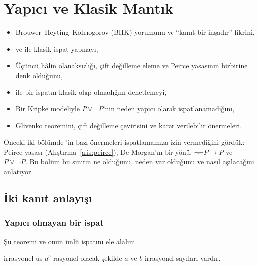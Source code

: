 \chapter{Yapıcı ve Klasik Mantık}\label{bol:yapici-klasik}

\begin{bolumhedefleri}
\begin{itemize}
  \item Brouwer--Heyting--Kolmogorov (BHK) yorumunu ve ``kanıt bir
        inşadır'' fikrini,
  \item {} ve  ile klasik
        ispat yapmayı,
  \item Üçüncü hâlin olanaksızlığı, çift değilleme eleme ve Peirce
        yasasının birbirine denk olduğunu,
  \item {} ile bir ispatın klasik olup olmadığını
        denetlemeyi,
  \item Bir Kripke modeliyle $P \vee \neg P$'nin neden yapıcı olarak
        ispatlanamadığını,
  \item Glivenko teoremini, çift değilleme çevirisini ve karar
        verilebilir önermeleri.
\end{itemize}
\end{bolumhedefleri}

Önceki iki bölümde \Lean{}'in bazı önermeleri ispatlamamıza izin
vermediğini gördük: Peirce yasası (Alıştırma~\ref{alis:peirce}),
De Morgan'ın bir yönü, $\neg\neg P \to P$ ve $P \vee \neg P$. Bu bölüm
bu sınırın ne olduğunu, neden var olduğunu ve nasıl aşılacağını
anlatıyor.

\section{İki kanıt anlayışı}\label{sec:iki-anlayis}

\subsection{Yapıcı olmayan bir ispat}

Şu teoremi ve onun ünlü ispatını ele alalım.

\begin{teorem}{}{irrasyonel-us}
$a^b$ rasyonel olacak şekilde $a$ ve $b$ irrasyonel sayıları vardır.
\end{teorem}

